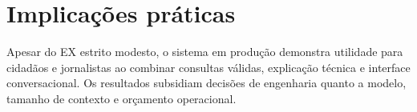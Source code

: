 \section{Implicações práticas}

Apesar do EX estrito modesto, o sistema em produção demonstra utilidade para cidadãos e jornalistas ao combinar consultas válidas, explicação técnica e interface conversacional. Os resultados subsidiam decisões de engenharia quanto a modelo, tamanho de contexto e orçamento operacional.
